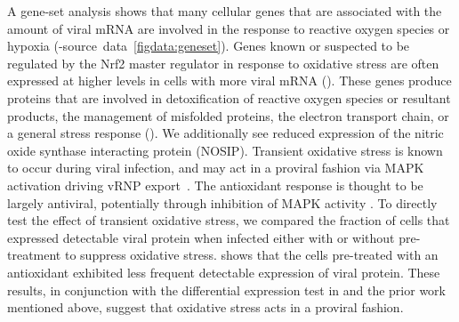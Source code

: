 \documentclass[9pt,lineno]{elife}
\begin{document}
\begin{figure}[t!]

\end{figure}

A gene-set analysis shows that many cellular genes that are associated with the amount of viral mRNA are involved in the response to reactive oxygen species or hypoxia (-source~data~\ref{figdata:geneset}). 
Genes known or suspected to be regulated by the Nrf2 master regulator in response to oxidative stress are often expressed at higher levels in cells with more viral mRNA ().
These genes produce proteins that are involved in detoxification of reactive oxygen species or resultant products, the management of misfolded proteins, the electron transport chain, or a general stress response (). 
We additionally see reduced expression of the nitric oxide synthase interacting protein (NOSIP). 
Transient oxidative stress is known to occur during viral infection, and may act in a proviral fashion via MAPK activation driving vRNP export~\citep{Amatore:2014cs}.
The antioxidant response is thought to be largely antiviral, potentially through inhibition of MAPK activity \citep{Lin:2016ec,Sgarbanti:2014ht}.
To directly test the effect of transient oxidative stress, we compared the fraction of cells that expressed detectable viral protein when infected either with or without pre-treatment to suppress oxidative stress.
 shows that the cells pre-treated with an antioxidant exhibited less frequent detectable expression of viral protein.
These results, in conjunction with the differential expression test in  and the prior work mentioned above, suggest that oxidative stress acts in a proviral fashion. 
\end{document}

